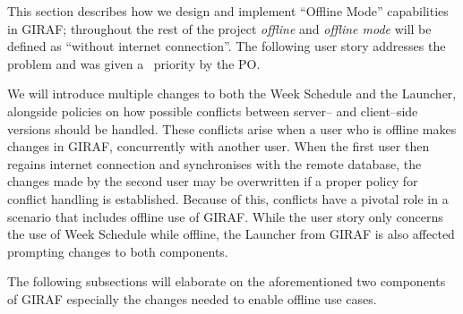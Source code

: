This section describes how we design and implement \enquote{Offline Mode} capabilities in GIRAF; throughout the rest of the project \textit{offline} and \textit{offline mode} will be defined as \enquote{without internet connection}.
The following user story addresses the problem and was given a \phigh~priority by the PO.

\begin{center}
\end{center}

We will introduce multiple changes to both the Week Schedule and the Launcher, alongside policies on how possible conflicts between server-- and client--side versions should be handled.
These conflicts arise when a user who is offline makes changes in GIRAF, concurrently with another user.
When the first user then regains internet connection and synchronises with the remote database, the changes made by the second user may be overwritten if a proper policy for conflict handling is established.
Because of this, conflicts have a pivotal role in a scenario that includes offline use of GIRAF.
While the user story only concerns the use of Week Schedule while offline, the Launcher from GIRAF is also affected prompting changes to both components.

The following subsections will elaborate on the aforementioned two components of GIRAF especially the changes needed to enable offline use cases.